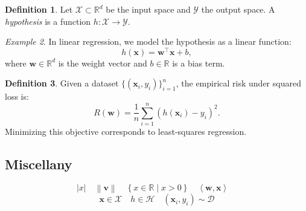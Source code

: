 \documentclass[11pt]{article}
\newcommand{\R}{\mathbb{R}}
\newcommand{\Xcal}{\mathcal{X}}  %
\newcommand{\Ycal}{\mathcal{Y}}  %
\newcommand{\Hcal}{\mathcal{H}}  %
\newcommand{\Dcal}{\mathcal{D}}  %
\newcommand{\vect}[1]{\bm{#1}}  %
\newcommand{\abs}[1]{\left|#1\right|}                    %
\newcommand{\norm}[1]{\left\lVert#1\right\rVert}         %
\newcommand{\set}[1]{\left\{#1\right\}}                  %
\newcommand{\inner}[2]{\left\langle#1, #2\right\rangle}  %
\theoremstyle{definition}
\newtheorem{definition}{Definition}[section]
\theoremstyle{plain}
\theoremstyle{remark}
\newtheorem{example}[definition]{Example}
\begin{document}
\begin{definition}
    Let \( \Xcal \subset \R^d \) be the input space and \( \Ycal \) the output space. A \emph{hypothesis} is a
    function \( h: \Xcal \to \Ycal \).
\end{definition}

\begin{example}
    In linear regression, we model the hypothesis as a linear function:
    \[
        h(\vect{x}) = \vect{w}^\top \vect{x} + b,
    \]
    where \( \vect{w} \in \R^d \) is the weight vector and \( b \in \R \) is a bias term.
\end{example}

\begin{definition}
    Given a dataset \( \{(\vect{x}_i, y_i)\}_{i=1}^n \), the empirical risk under squared loss is:
    \[
        R(\vect{w}) = \frac{1}{n} \sum_{i=1}^n \left( h(\vect{x}_i) - y_i \right)^2.
    \]
    Minimizing this objective corresponds to least-squares regression.
\end{definition}

\subsection{Miscellany}

\[
    \abs{x}
    \quad
    \norm{\vect{v}}
    \quad
    \set{x \in \R \mid x > 0}
    \quad
    \inner{\vect{w}}{\vect{x}}
    \quad
\]
\[
    \vect{x} \in \Xcal
    \quad
    h \in \Hcal
    \quad
    (\vect{x}_i, y_i) \sim \Dcal
\]
\end{document}
